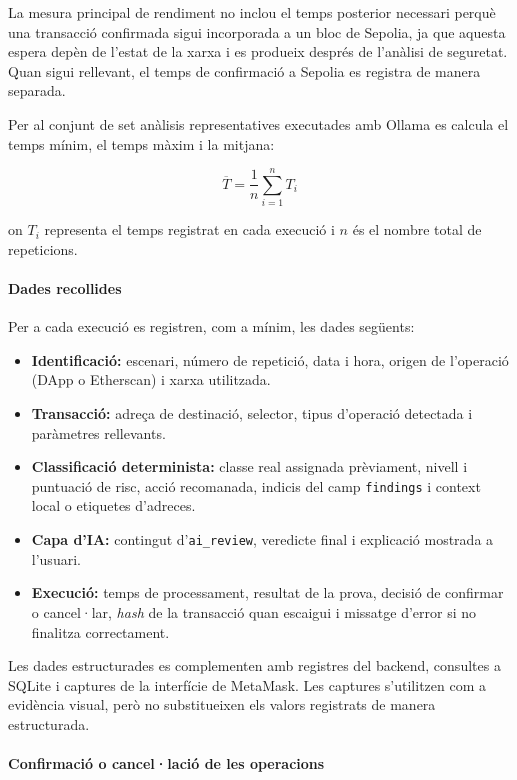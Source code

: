 La mesura principal de rendiment no inclou el temps posterior necessari perquè una transacció confirmada sigui incorporada a un bloc de Sepolia, ja que aquesta espera depèn de l'estat de la xarxa i es produeix després de l'anàlisi de seguretat. Quan sigui rellevant, el temps de confirmació a Sepolia es registra de manera separada.

Per al conjunt de set anàlisis representatives executades amb Ollama es calcula el temps mínim, el temps màxim i la mitjana:

\[
\overline{T} =
\frac{1}{n}
\sum_{i=1}^{n} T_i
\]

on \(T_i\) representa el temps registrat en cada execució i \(n\) és el nombre total de repeticions.

\paragraph{Dades recollides}

Per a cada execució es registren, com a mínim, les dades següents:

\begin{itemize}
    \item \textbf{Identificació:} escenari, número de repetició, data i hora, origen de l'operació (DApp o Etherscan) i xarxa utilitzada.
    \item \textbf{Transacció:} adreça de destinació, selector, tipus d'operació detectada i paràmetres rellevants.
    \item \textbf{Classificació determinista:} classe real assignada prèviament, nivell i puntuació de risc, acció recomanada, indicis del camp \texttt{findings} i context local o etiquetes d'adreces.
    \item \textbf{Capa d'IA:} contingut d'\texttt{ai\_review}, veredicte final i explicació mostrada a l'usuari.
    \item \textbf{Execució:} temps de processament, resultat de la prova, decisió de confirmar o cancel·lar, \textit{hash} de la transacció quan escaigui i missatge d'error si no finalitza correctament.
\end{itemize}

Les dades estructurades es complementen amb registres del backend, consultes a SQLite i captures de la interfície de MetaMask. Les captures s'utilitzen com a evidència visual, però no substitueixen els valors registrats de manera estructurada.

\paragraph{Confirmació o cancel·lació de les operacions}

